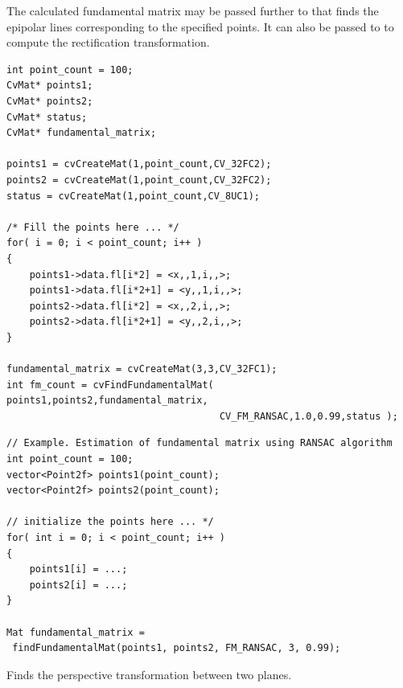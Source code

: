 The calculated fundamental matrix may be passed further to
 that finds the epipolar lines
corresponding to the specified points. It can also be passed to  to compute the rectification transformation.

\ifC
{}
\begin{lstlisting}
int point_count = 100;
CvMat* points1;
CvMat* points2;
CvMat* status;
CvMat* fundamental_matrix;

points1 = cvCreateMat(1,point_count,CV_32FC2);
points2 = cvCreateMat(1,point_count,CV_32FC2);
status = cvCreateMat(1,point_count,CV_8UC1);

/* Fill the points here ... */
for( i = 0; i < point_count; i++ )
{
    points1->data.fl[i*2] = <x,,1,i,,>;
    points1->data.fl[i*2+1] = <y,,1,i,,>;
    points2->data.fl[i*2] = <x,,2,i,,>;
    points2->data.fl[i*2+1] = <y,,2,i,,>;
}

fundamental_matrix = cvCreateMat(3,3,CV_32FC1);
int fm_count = cvFindFundamentalMat( points1,points2,fundamental_matrix,
                                     CV_FM_RANSAC,1.0,0.99,status );
\end{lstlisting}
\fi
\ifCpp
\begin{lstlisting}
// Example. Estimation of fundamental matrix using RANSAC algorithm
int point_count = 100;
vector<Point2f> points1(point_count);
vector<Point2f> points2(point_count);

// initialize the points here ... */
for( int i = 0; i < point_count; i++ )
{
    points1[i] = ...;
    points2[i] = ...;
}

Mat fundamental_matrix =
 findFundamentalMat(points1, points2, FM_RANSAC, 3, 0.99);
\end{lstlisting}
\fi

Finds the perspective transformation between two planes.

